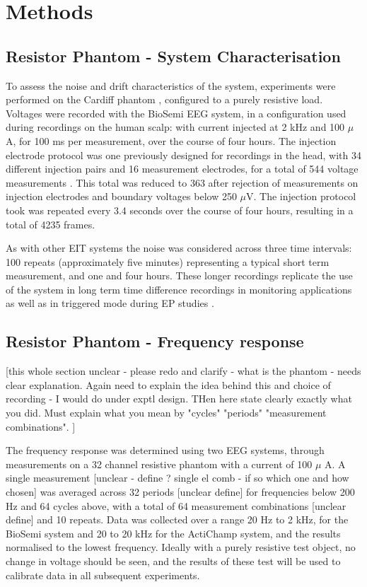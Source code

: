 \section{Methods}
\subsection{Resistor Phantom - System Characterisation}

To assess the noise and drift characteristics of the system, experiments were performed on the Cardiff phantom \cite{griffiths1995cole}, configured to a purely resistive load. Voltages were recorded with the BioSemi EEG system, in a configuration used during recordings on the human scalp: with current injected at 2 kHz and 100 $\mu$ A, for 100 ms per measurement, over the course of four hours. The injection electrode protocol was one previously designed for recordings in the head, with 34 different injection pairs and 16 measurement electrodes, for a total of 544 voltage measurements \cite{Fabrizi2009}. This total was reduced to 363 after rejection of measurements on injection electrodes and boundary voltages below 250 $\mu$V. The injection protocol took was repeated every 3.4 seconds over the course of four hours, resulting in a total of 4235 frames. 

As with other EIT systems \cite{oh2007multi} the noise was considered across three time intervals: 100 repeats (approximately five minutes) representing a typical short term measurement, and one and four hours. These longer recordings replicate the use of the system in long term time difference recordings in monitoring applications \cite{fu2014use} \cite{adler2012whither} as well as in triggered mode during EP studies \cite{Aristovich_2016}.

\subsection{Resistor Phantom - Frequency response}

[this whole section unclear - please redo and clarify - what is the phantom - needs clear explanation. Again need to explain the idea behind this and choice of recording - I would do under exptl design. THen here state clearly exactly what you did.  Must explain what you mean by "cycles" "periods" "measurement combinations". ] 

The frequency response was determined using two EEG systems, through measurements on a 32 channel resistive phantom with a current of 100 $\mu$ A. A single measurement [unclear - define ? single el comb - if so which one and how chosen] was averaged across 32 periods [unclear define] for frequencies below 200 Hz and 64 cycles above, with a total of 64 measurement combinations [unclear define] and 10 repeats. Data was collected over a range 20 Hz to 2 kHz, for the BioSemi system and 20 to 20 kHz for the ActiChamp system, and the results normalised to the lowest frequency.  Ideally with a purely resistive test object, no change in voltage should be seen, and the results of these test will be used to calibrate data in all subsequent experiments.